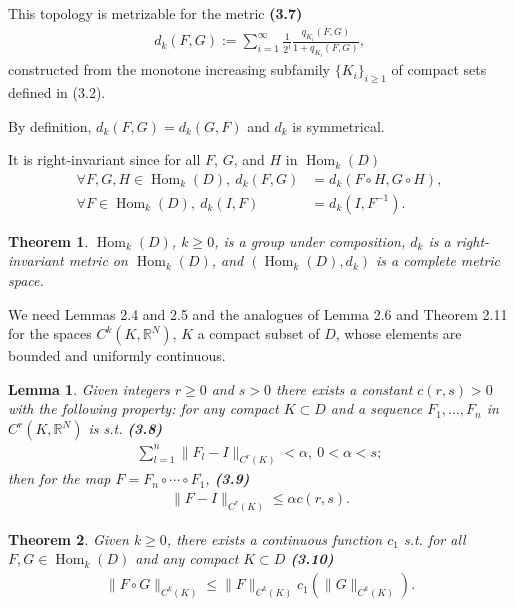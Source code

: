 \documentclass{book}
\numberwithin{equation}{section}
\newtheorem{lemma}{Lemma}[section]
\newtheorem{theorem}{Theorem}[section]
\begin{document}
\begin{enumerate}
    This topology is metrizable for the metric \textbf{(3.7)}
    \begin{align*}
        d_k(F,G) := \sum_{i=1}^\infty \frac{1}{2^i}\frac{q_{K_i}(F,G)}{1 + q_{K_i}(F,G)},
    \end{align*}
    constructed from the monotone increasing subfamily $\{K_i\}_{i\ge 1}$ of compact sets defined in (3.2).
    
    By definition, $d_k(F,G) = d_k(G,F)$ and $d_k$ is symmetrical.
    
    It is right-invariant since for all $F$, $G$, and $H$ in $\operatorname{Hom}_k(D)$
    \begin{align*}
        \forall F,G,H\in\operatorname{Hom}_k(D),\ d_k(F,G) &= d_k\left(F\circ H,G\circ H\right),\\
        \forall F\in\operatorname{Hom}_k(D),\ d_k(I,F) &= d_k\left(I,F^{-1}\right).
    \end{align*}
    
    \begin{theorem}
        $\operatorname{Hom}_k(D)$, $k\ge 0$, is a group under composition, $d_k$ is a right-invariant metric on $\operatorname{Hom}_k(D)$, and $(\operatorname{Hom}_k(D),d_k)$ is a complete metric space.
    \end{theorem}
    We need Lemmas 2.4 and 2.5 and the analogues of Lemma 2.6 and Theorem 2.11 for the spaces $C^k(K,\mathbb{R}^N)$, $K$ a compact subset of $D$, whose elements are bounded and uniformly continuous.
    
    \begin{lemma}
        Given integers $r\ge 0$ and $s > 0$ there exists a constant $c(r,s) > 0$ with the following property: for any compact $K\subset D$ and a sequence $F_1,\ldots,F_n$ in $C^r(K,\mathbb{R}^N)$ is s.t. \textbf{(3.8)}
        \begin{align*}
            \sum_{l=1}^n \|F_l - I\|_{C^r(K)} < \alpha,\ 0 < \alpha < s;
        \end{align*}
        then for the map $F = F_n\circ\cdots\circ F_1$, \textbf{(3.9)}
        \begin{align*}
            \|F - I\|_{C^r(K)}\le\alpha c(r,s).
        \end{align*}
    \end{lemma}
    
    \begin{theorem}
        Given $k\ge 0$, there exists a continuous function $c_1$ s.t. for all $F,G\in\operatorname{Hom}_k(D)$ and any compact $K\subset D$ \textbf{(3.10)}
        \begin{align*}
            \|F\circ G\|_{C^k(K)}\le\|F\|_{C^k(K)}c_1\left(\|G\|_{C^k(K)}\right).
        \end{align*}
    \end{theorem}


\end{enumerate}
\end{document}
